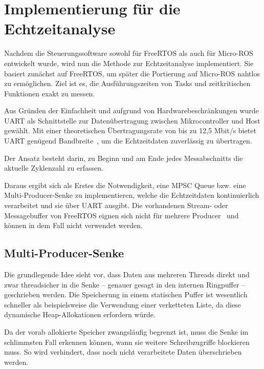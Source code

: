 \section{Implementierung für die Echtzeitanalyse}

Nachdem die Steuerungssoftware sowohl für FreeRTOS als auch für Micro-ROS
entwickelt wurde, wird nun die Methode zur Echtzeitanalyse implementiert. Sie
basiert zunächst auf FreeRTOS, um später die Portierung auf Micro-ROS nahtlos zu
ermöglichen. Ziel ist es, die Ausführungszeiten von Tasks und zeitkritischen
Funktionen exakt zu messen.

Aus Gründen der Einfachheit und aufgrund von Hardwarebeschränkungen wurde UART
als Schnittstelle zur Datenübertragung zwischen Mikrocontroller und Host
gewählt. Mit einer theoretischen Übertragungsrate von bis zu 12,5 Mbit/s bietet
UART genügend Bandbreite~\cite[S. 2]{stm32_datasheet}, um die Echtzeitdaten
zuverlässig zu übertragen.

Der Ansatz besteht darin, zu Beginn und am Ende jedes Messabschnitts die
aktuelle Zyklenzahl zu erfassen.

Daraus ergibt sich als Erstes die Notwendigkeit, eine \ac{MPSC} Queue bzw. eine
Multi-Producer-Senke zu implementieren, welche die Echtzeitdaten kontinuierlich
verarbeitet und sie über UART ausgibt. Die vorhandenen Stream- oder
Messagebuffer von FreeRTOS eignen sich nicht für mehrere
Producer~\cite{FreeRTOSStreamBuffer} und können in dem Fall nicht verwendet
werden.

\subsection{Multi-Producer-Senke}


Die grundlegende Idee sieht vor, dass Daten aus mehreren Threads direkt und zwar
threadsicher in die Senke -- genauer gesagt in den internen Ringpuffer --
geschrieben werden. Die Speicherung in einem statischen Puffer ist wesentlich
schneller als beispielsweise die Verwendung einer verketteten Liste, da diese
dynamische Heap-Allokationen erfordern würde.

Da der vorab allokierte Speicher zwangsläufig begrenzt ist, muss die Senke im
schlimmsten Fall erkennen können, wann sie weitere Schreibzugriffe blockieren
muss. So wird verhindert, dass noch nicht verarbeitete Daten überschrieben
werden.

